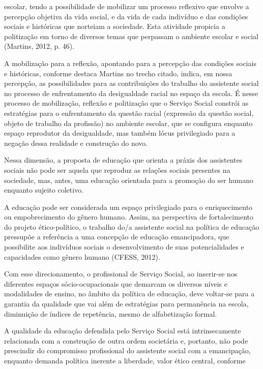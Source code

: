  escolar, tendo a possibilidade de mobilizar um processo reflexivo que envolve a
 percepção objetiva da vida social, e da vida de cada indivíduo e das condições
 sociais e históricas que norteiam a sociedade. Esta atividade propicia a
 politização em torno de diversos temas que perpassam o ambiente escolar e social
 (Martins, 2012, p. 46).\par A mobilização para a reflexão, apontando para a percepção das condições sociais e
 históricas, conforme destaca Martins no trecho citado, indica, em nossa percepção, as
 possibilidades para as contribuições do trabalho do assistente social no processo de
 enfrentamento da desigualdade racial no espaço da escola. É nesse processo de
 mobilização, reflexão e politização que o Serviço Social constrói as estratégias para
 o enfrentamento da questão racial (expressão da questão social, objeto de trabalho da
 profissão) no ambiente escolar, que se configura enquanto espaço reprodutor da
 desigualdade, mas também lócus privilegiado para a negação dessa realidade e
 construção do novo.\par Nessa dimensão, a proposta de educação que orienta a práxis dos assistentes sociais
 não pode ser aquela que reproduz as relações sociais presentes na sociedade, mas,
 antes, uma educação orientada para a promoção do ser humano enquanto sujeito
 coletivo.\par A educação pode ser considerada um espaço privilegiado para o enriquecimento ou
 empobrecimento do gênero humano. Assim, na perspectiva de fortalecimento do
 projeto ético-político, o trabalho do/a assistente social na política de educação
 pressupõe a referência a uma concepção de educação emancipadora, que possibilite
 aos indivíduos sociais o desenvolvimento de suas potencialidades e capacidades
 como gênero humano (CFESS, 2012).\par Com esse direcionamento, o profissional de Serviço Social, ao inserir-se nos
 diferentes espaços sócio-ocupacionais que demarcam os diversos níveis e modalidades
 de ensino, no âmbito da política de educação, deve voltar-se para a garantia da
 qualidade que vai além de estratégias para permanência na escola, diminuição de
 índices de repetência, mesmo de alfabetização formal.\par A qualidade da educação defendida pelo Serviço Social está intrinsecamente
 relacionada com a construção de outra ordem societária e, portanto, não pode
 prescindir do compromisso profissional do assistente social com a emancipação,
 enquanto demanda política inerente a liberdade, valor ético central, conforme
